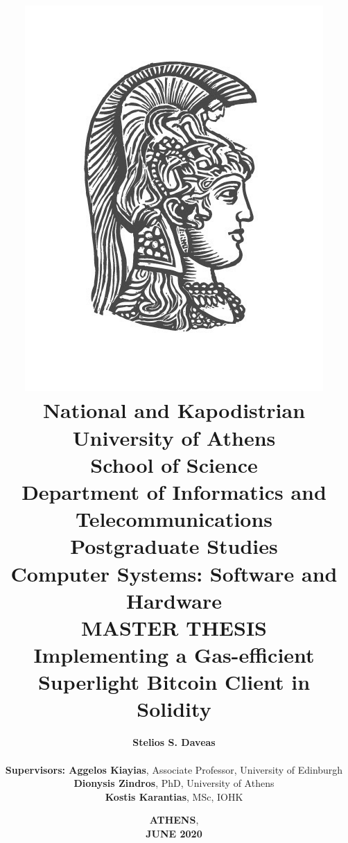 \title{
    {\includegraphics[scale=0.7]{figures/logo_uoa.jpg}}\\
    {\Large \textbf{National and Kapodistrian University of Athens \\
    School of Science}} \\
    {\large \textbf{Department of Informatics and Telecommunications}}\\
    \vspace{1cm}
    {\large \textbf{Postgraduate Studies}} \\
    {\large \textbf{Computer Systems: Software and Hardware}}\\
    \vspace{5mm}
    {\large \textbf{MASTER THESIS}}\\
    \vspace{3mm}
    {\textbf{\Large Implementing a Gas-efficient\\Superlight Bitcoin Client in Solidity}}
    }

\author{

    \hspace{-1.5cm}
    \textbf{\normalsize Stelios S. Daveas}\\

    \vspace{0.8cm} \\
    \textbf{\normalsize Supervisors: Aggelos Kiayias}, \normalsize Associate Professor, University of Edinburgh\\
    \hspace{-0.70cm}
    \textbf{\normalsize Dionysis Zindros}, \normalsize PhD, University of Athens\\
    \hspace{-3.50cm}
    \textbf{\normalsize Kostis Karantias}, \normalsize MSc, IOHK
}

\date{\textbf{ATHENS}, \\ \textbf{JUNE 2020}}
